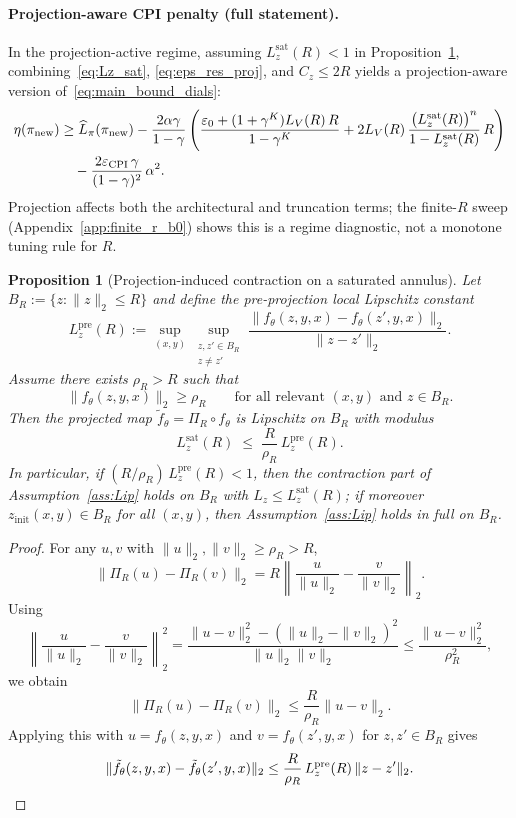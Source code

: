 \documentclass{article}
\theoremstyle{plain}
\newtheorem{proposition}[theorem]{Proposition}
\theoremstyle{definition}
\theoremstyle{remark}
\begin{document}
\paragraph{Projection-aware CPI penalty (full statement).}
In the projection-active regime, assuming $L_z^{\mathrm{sat}}(R)<1$ in Proposition~\ref{prop:proj_sat_contraction}, combining~\eqref{eq:Lz_sat}, \eqref{eq:eps_res_proj}, and $C_z\le 2R$ yields a projection-aware version of~\eqref{eq:main_bound_dials}:
\begin{align}
\eta(\pi_{\mathrm{new}})
&\ge
\widehat{L}_\pi(\pi_{\mathrm{new}})
-
\frac{2\alpha\gamma}{1-\gamma}
\left(
\frac{\varepsilon_0 + (1+\gamma^K)L_V(R)\,R}{1-\gamma^K}
+
2L_V(R)\,\frac{\bigl(L_z^{\mathrm{sat}}(R)\bigr)^n}{1-L_z^{\mathrm{sat}}(R)}\,R
\right)
\notag\\
&\quad-
\frac{2\varepsilon_{\mathrm{CPI}}\,\gamma}{(1-\gamma)^2}\,\alpha^2.
\label{eq:main_bound_proj}
\end{align}
Projection affects both the architectural and truncation terms; the finite-$R$ sweep (Appendix~\ref{app:finite_r_b0}) shows this is a regime diagnostic, not a monotone tuning rule for $R$.

\begin{proposition}[Projection-induced contraction on a saturated annulus]
\label{prop:proj_sat_contraction}
Let $B_R:=\{z:\|z\|_2\le R\}$ and define the pre-projection local Lipschitz constant
\[
L_z^{\mathrm{pre}}(R)
:=
\sup_{(x,y)}
\sup_{\substack{z,z'\in B_R\\ z\neq z'}}
\frac{\|f_\theta(z,y,x)-f_\theta(z',y,x)\|_2}{\|z-z'\|_2}.
\]
Assume there exists $\rho_R>R$ such that
\[
\|f_\theta(z,y,x)\|_2 \ge \rho_R
\qquad
\text{for all relevant }(x,y)\text{ and }z\in B_R.
\]
Then the projected map $\tilde f_\theta=\Pi_R\circ f_\theta$ is Lipschitz on $B_R$ with modulus
\[
L_z^{\mathrm{sat}}(R)
\;\le\;
\frac{R}{\rho_R}\,L_z^{\mathrm{pre}}(R).
\]
In particular, if $(R/\rho_R)\,L_z^{\mathrm{pre}}(R)<1$, then the contraction part of Assumption~\ref{ass:Lip} holds on $B_R$ with $L_z\le L_z^{\mathrm{sat}}(R)$; if moreover $z_{\mathrm{init}}(x,y)\in B_R$ for all $(x,y)$, then Assumption~\ref{ass:Lip} holds in full on $B_R$.
\end{proposition}

\begin{proof}
For any $u,v$ with $\|u\|_2,\|v\|_2\ge \rho_R>R$,
\[
\|\Pi_R(u)-\Pi_R(v)\|_2
=
R\left\|\frac{u}{\|u\|_2}-\frac{v}{\|v\|_2}\right\|_2.
\]
Using
\[
\left\|\frac{u}{\|u\|_2}-\frac{v}{\|v\|_2}\right\|_2^2
=
\frac{\|u-v\|_2^2-(\|u\|_2-\|v\|_2)^2}{\|u\|_2\|v\|_2}
\le
\frac{\|u-v\|_2^2}{\rho_R^2},
\]
we obtain
\[
\|\Pi_R(u)-\Pi_R(v)\|_2
\le
\frac{R}{\rho_R}\|u-v\|_2.
\]
Applying this with $u=f_\theta(z,y,x)$ and $v=f_\theta(z',y,x)$ for $z,z'\in B_R$ gives
\[
\|\tilde f_\theta(z,y,x)-\tilde f_\theta(z',y,x)\|_2
\le
\frac{R}{\rho_R}\,L_z^{\mathrm{pre}}(R)\,\|z-z'\|_2.
\qedhere
\]
\end{proof}
\end{document}
